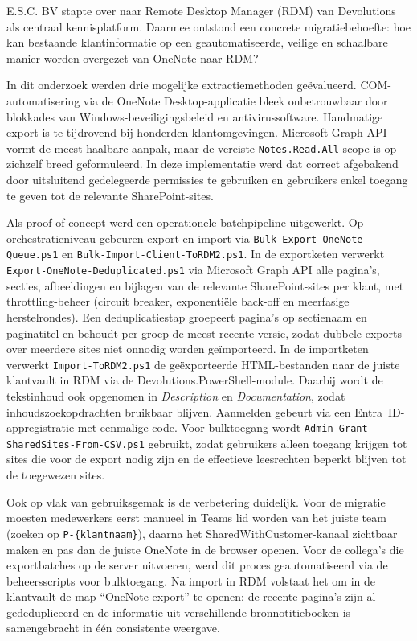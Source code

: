 E.S.C. BV stapte over naar Remote Desktop Manager (RDM) van Devolutions als centraal kennisplatform. Daarmee ontstond een concrete migratiebehoefte: hoe kan bestaande klantinformatie op een geautomatiseerde, veilige en schaalbare manier worden overgezet van OneNote naar RDM?

In dit onderzoek werden drie mogelijke extractiemethoden geëvalueerd. COM-automatisering via de OneNote Desktop-applicatie bleek onbetrouwbaar door blokkades van Windows-beveiligingsbeleid en antivirussoftware. Handmatige export is te tijdrovend bij honderden klantomgevingen. Microsoft Graph API vormt de meest haalbare aanpak, maar de vereiste \texttt{Notes.Read.All}-scope is op zichzelf breed geformuleerd. In deze implementatie werd dat correct afgebakend door uitsluitend gedelegeerde permissies te gebruiken en gebruikers enkel toegang te geven tot de relevante SharePoint-sites.

Als proof-of-concept werd een operationele batchpipeline uitgewerkt. Op orchestratieniveau gebeuren export en import via \texttt{Bulk-Export-OneNote-Queue.ps1} en \texttt{Bulk-Import-Client-ToRDM2.ps1}. In de exportketen verwerkt \texttt{Export-OneNote-Deduplicated.ps1} via Microsoft Graph API alle pagina's, secties, afbeeldingen en bijlagen van de relevante SharePoint-sites per klant, met throttling-beheer (circuit breaker, exponentiële back-off en meerfasige herstelrondes). Een deduplicatiestap groepeert pagina's op sectienaam en paginatitel en behoudt per groep de meest recente versie, zodat dubbele exports over meerdere sites niet onnodig worden geïmporteerd. In de importketen verwerkt \texttt{Import-ToRDM2.ps1} de geëxporteerde HTML-bestanden naar de juiste klantvault in RDM via de Devolutions.PowerShell-module. Daarbij wordt de tekstinhoud ook opgenomen in \emph{Description} en \emph{Documentation}, zodat inhoudszoekopdrachten bruikbaar blijven. Aanmelden gebeurt via een Entra~ID-appregistratie met eenmalige code. Voor bulktoegang wordt \texttt{Admin-Grant-SharedSites-From-CSV.ps1} gebruikt, zodat gebruikers alleen toegang krijgen tot sites die voor de export nodig zijn en de effectieve leesrechten beperkt blijven tot de toegewezen sites.

Ook op vlak van gebruiksgemak is de verbetering duidelijk. Voor de migratie moesten medewerkers eerst manueel in Teams lid worden van het juiste team (zoeken op \texttt{P-\{klantnaam\}}), daarna het SharedWithCustomer-kanaal zichtbaar maken en pas dan de juiste OneNote in de browser openen. Voor de collega's die exportbatches op de server uitvoeren, werd dit proces geautomatiseerd via de beheersscripts voor bulktoegang. Na import in RDM volstaat het om in de klantvault de map \enquote{OneNote export} te openen: de recente pagina's zijn al gededupliceerd en de informatie uit verschillende bronnotitieboeken is samengebracht in één consistente weergave.


